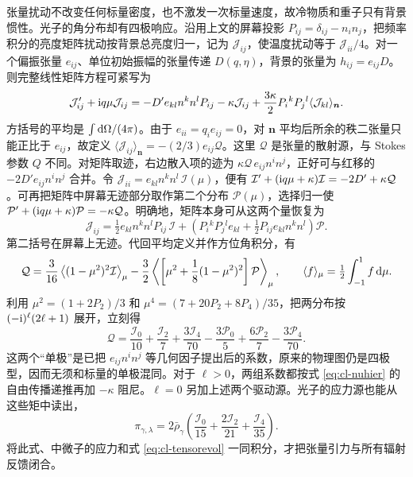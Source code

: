 张量扰动不改变任何标量密度，也不激发一次标量速度，故冷物质和重子只有背景惯性。光子的角分布却有四极响应。沿用上文的屏幕投影 $P_{ij}=\delta_{ij}-n_i n_j$，把频率积分的亮度矩阵扰动按背景总亮度归一，记为 $\mathcal J_{ij}$，使温度扰动等于 $\mathcal J_{ii}/4$。对一个偏振张量 $e_{ij}$、单位初始振幅的张量传递 $D(q,\eta)$，背景的张量为 $h_{ij}=e_{ij}D$。则完整线性矩阵方程可紧写为
\[
 \mathcal J_{ij}'+\mathrm{i} q\mu\mathcal J_{ij}
    =-D'e_{kl}n^k n^l P_{ij}-\kappa\mathcal J_{ij}
      +\frac{3\kappa}{2}P_i{}^kP_j{}^l
                                \langle\mathcal J_{kl}\rangle_{\bm n}.
\]
方括号的平均是 $\int\dd\Omega/(4\pi)$。由于 $e_{ii}=q_i e_{ij}=0$，对 $\bm n$ 平均后所余的秩二张量只能正比于 $e_{ij}$，故定义 $\langle\mathcal J_{ij}\rangle_{\bm n}=-(2/3)e_{ij}\mathcal Q$。这里 $\mathcal Q$ 是张量的散射源，与 Stokes 参数 $Q$ 不同。对矩阵取迹，右边散入项的迹为 $\kappa\mathcal Q\,e_{ij}n^in^j$，正好可与红移的 $-2D'e_{ij}n^in^j$ 合并。令 $\mathcal J_{ii}=e_{kl}n^k n^l\,\mathcal I(\mu)$，便有 $\mathcal I'+(\mathrm{i} q\mu+\kappa)\mathcal I=-2D'+\kappa\mathcal Q$。可再把矩阵中屏幕无迹部分取作第二个分布 $\mathcal P(\mu)$，选择归一使 $\mathcal P'+(\mathrm{i} q\mu+\kappa)\mathcal P=-\kappa\mathcal Q$。明确地，矩阵本身可从这两个量恢复为
\[
 \mathcal J_{ij}
 =\tfrac12 e_{kl}n^kn^l P_{ij}\,\mathcal I
   +\left(P_i{}^kP_j{}^l e_{kl}
          +\tfrac12 P_{ij}e_{kl}n^kn^l\right)\mathcal P .
\]
第二括号在屏幕上无迹。代回平均定义并作方位角积分，有
\[
 \mathcal Q=\frac{3}{16}\left\langle(1-\mu^2)^2\mathcal I\right\rangle_\mu
     -\frac32\left\langle\left[\mu^2+\frac18(1-\mu^2)^2\right]
                      \mathcal P\right\rangle_\mu,\qquad
 \langle f\rangle_\mu=\tfrac12\int_{-1}^1f\,\dd\mu .
\]
利用 $\mu^2=(1+2P_2)/3$ 和
$\mu^4=(7+20P_2+8P_4)/35$，把两分布按 $(-\mathrm{i})^\ell(2\ell+1)$ 展开，立刻得
\begin{equation}\label{eq:cl-tensorQ}
 \mathcal Q=\frac{\mathcal I_0}{10}+\frac{\mathcal I_2}{7}
       +\frac{3\mathcal I_4}{70}
       -\frac{3\mathcal P_0}{5}+\frac{6\mathcal P_2}{7}
       -\frac{3\mathcal P_4}{70}.
\end{equation}
这两个“单极”是已把 $e_{ij}n^in^j$ 等几何因子提出后的系数，原来的物理图仍是四极型，因而无须和标量的单极混同。对于 $\ell>0$，两组系数都按式 \eqref{eq:cl-nuhier} 的自由传播递推再加 $-\kappa$ 阻尼。$\ell=0$ 另加上述两个驱动源。光子的应力源也能从这些矩中读出，
\[
 \pi_{\gamma,\lambda}
  =2\bar\rho_\gamma
        \left(\frac{\mathcal I_0}{15}
               +\frac{2\mathcal I_2}{21}+\frac{\mathcal I_4}{35}\right).
\]
将此式、中微子的应力和式 \eqref{eq:cl-tensorevol} 一同积分，才把张量引力与所有辐射反馈闭合。

